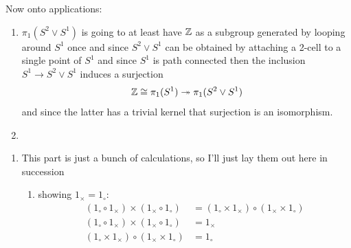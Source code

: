 \documentclass{pset}
\begin{document}
\begin{problem}
\begin{enumerate}[label=1.1.\arabic*]
        Now onto applications:
        \begin{enumerate}
            \item $\pi_1(S^2 \vee S^1)$ is going to at least have $\mathbb{Z}$ as a subgroup generated by looping around $S^1$ once and since $S^2 \vee S^1$ can be obtained by attaching a 2-cell to a single point of $S^1$ and since $S^1$ is path connected then the inclusion $S^1 \to S^2 \vee S^1$ induces a surjection
            \[\mathbb{Z} \cong \pi_1(S^1) \twoheadrightarrow \pi_1(S^2 \vee S^1)\]
            and since the latter has a trivial kernel that surjection is an isomorphism.
            \item 
        \end{enumerate}
    \end{enumerate}
\end{problem}
\begin{problem}
    \begin{enumerate}
        \item This part is just a bunch of calculations, so I'll just lay them out here in succession
        \begin{enumerate}[label=\roman*.]
            \item showing \(1_\times = 1_\circ\):
            \begin{align*}
                (1_\circ \circ 1_\times) \times (1_\times \circ 1_\circ) &= (1_\circ \times 1_\times) \circ (1_\times \times 1_\circ) \\
                (1_\circ \circ 1_\times) \times (1_\times \circ 1_\circ) &= 1_\times \\
                (1_\circ \times 1_\times) \circ (1_\times \times 1_\circ) &= 1_\circ 
            \end{align*}


\end{enumerate}
\end{enumerate}
\end{problem}
\end{document}
